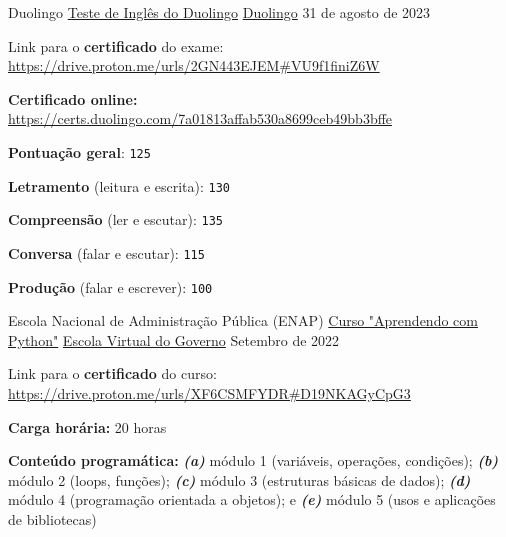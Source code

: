 

\begin{cventries}

  \cventry
    {Duolingo} %
    {\href{https://www.englishtest.duolingo.com/applicants}{Teste de Inglês do Duolingo}} %
    {\href{https://www.duolingo.com/}{Duolingo}} %
    {31 de agosto de 2023} %
    {
      \begin{cvitems} %
        \item {Link para o \textbf{certificado} do exame: \url{https://drive.proton.me/urls/2GN443EJEM#VU9f1finiZ6W}}
        \item {\textbf{Certificado online:} \url{https://certs.duolingo.com/7a01813affab530a8699ceb49bb3bffe}}
        \item {\textbf{Pontuação geral}: \texttt{125}}
        \item {\textbf{Letramento} (leitura e escrita): \texttt{130}}
        \item {\textbf{Compreensão} (ler e escutar): \texttt{135}}
        \item {\textbf{Conversa} (falar e escutar): \texttt{115}}
        \item {\textbf{Produção} (falar e escrever): \texttt{100}}
      \end{cvitems}
    }

  \cventry
    {Escola Nacional de Administração Pública (ENAP)} %
    {\href{https://www.escolavirtual.gov.br/curso/629}{Curso "Aprendendo com Python"}} %
    {\href{https://www.escolavirtual.gov.br/}{Escola Virtual do Governo}} %
    {Setembro de 2022} %
    {
      \begin{cvitems} %
        \item {Link para o \textbf{certificado} do curso: \url{https://drive.proton.me/urls/XF6CSMFYDR#D19NKAGyCpG3}}
        \item {\textbf{Carga horária:} 20 horas}
        \item{\textbf{Conteúdo programática:} \textbf{\textit{(a)}} módulo 1 (variáveis, operações, condições); \textbf{\textit{(b)}} módulo 2 (loops, funções); \textbf{\textit{(c)}} módulo 3 (estruturas básicas de dados); \textbf{\textit{(d)}} módulo 4 (programação orientada a objetos); e \textbf{\textit{(e)}} módulo 5 (usos e aplicações de bibliotecas)}
      \end{cvitems}
    }


\end{cventries}
